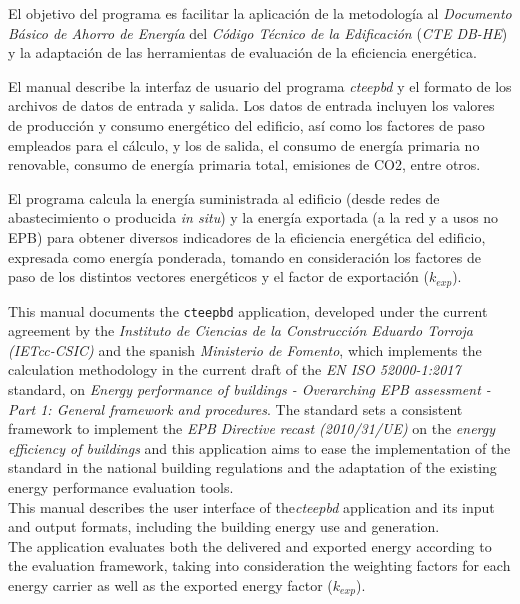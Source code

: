 \documentclass[10pt,notitlepage,oneside,a4paper]{article}
\begin{document}
El objetivo del programa es facilitar la aplicación de la metodología al \textit{Documento Básico de Ahorro de Energía} del \textit{Código Técnico de la Edificación} (\textit{CTE DB-HE}) y la adaptación de las herramientas de evaluación de la eficiencia energética.

El manual describe la interfaz de usuario del programa \textit{cteepbd} y el formato de los archivos de datos de entrada y salida. Los datos de entrada incluyen los valores de producción y consumo energético del edificio, así como los factores de paso empleados para el cálculo, y los de salida, el consumo de energía primaria no renovable, consumo de energía primaria total, emisiones de CO2, entre otros.

El programa calcula la energía suministrada al edificio (desde redes de abastecimiento o producida \textit{in situ}) y la energía exportada (a la red y a usos no EPB) para obtener diversos indicadores de la eficiencia energética del edificio, expresada como energía ponderada, tomando en consideración los factores de paso de los distintos vectores energéticos y el factor de exportación ($k_{exp}$).

\begin{myquote}\footnotesize
This manual documents the \texttt{cteepbd} application, developed under the current agreement by the \textit{Instituto de Ciencias de la Construcción Eduardo Torroja (IETcc-CSIC)} and the spanish \textit{Ministerio de Fomento}, which implements the calculation methodology in the current draft of the \textit{EN ISO 52000-1:2017} standard, on \textit{Energy performance of buildings - Overarching EPB assessment - Part 1: General framework and procedures}. The standard sets a consistent framework to implement the \textit{EPB Directive recast (2010/31/UE)} on the \textit{energy efficiency of buildings} and this application aims to ease the implementation of the standard in the national building regulations and the adaptation of the existing energy performance evaluation tools.
\\

This manual describes the user interface of the\textit{cteepbd} application and its input and output formats, including the building energy use and generation.
\\

The application evaluates both the delivered and exported energy according to the evaluation framework, taking into consideration the weighting factors for each energy carrier as well as the exported energy factor ($k_{exp}$).
\end{myquote}
\end{document}
